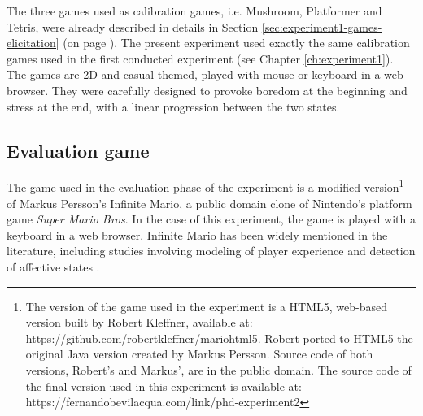 The three games used as calibration games, i.e. Mushroom, Platformer and Tetris, were already described in details in Section \ref{sec:experiment1-games-elicitation} (on page \pageref{sec:experiment1-games-elicitation}). The present experiment used exactly the same calibration games used in the first conducted experiment (see Chapter \ref{ch:experiment1}). The games are 2D and casual-themed, played with mouse or keyboard in a web browser. They were carefully designed to provoke boredom at the beginning and stress at the end, with a linear progression between the two states.

\subsection{Evaluation game}
\label{sec:experiment2-evaluation-game}





The game used in the evaluation phase of the experiment is a modified version\footnote{The version of the game used in the experiment is a HTML5, web-based version built by Robert Kleffner, available at: https://github.com/robertkleffner/mariohtml5. Robert ported to HTML5 the original Java version created by Markus Persson. Source code of both versions, Robert's and Markus', are in the public domain. The source code of the final version used in this experiment is available at: https://fernandobevilacqua.com/link/phd-experiment2} of Markus Persson's Infinite Mario, a public domain clone of Nintendo's platform game \textit{Super Mario Bros}. In the case of this experiment, the game is played with a keyboard in a web browser. Infinite Mario has been widely mentioned in the literature, including studies involving modeling of player experience \parencite{pedersen2009modeling,pedersen2010modeling,shaker2011game} and detection of affective states \parencite{shaker2011feature}.

